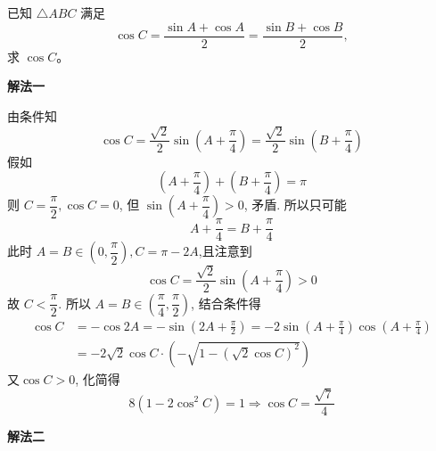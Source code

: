 \begin{questions}
    \question 已知 \(\triangle ABC\) 满足  
        \[
          \cos C = \frac{\sin A + \cos A}{2} = \frac{\sin B + \cos B}{2},
        \]
        求 \(\cos C\)。  
    \begin{solution}
        \textbf{解法一}
        
        由条件知 $$\cos C=\frac{\sqrt{2}}{2}\sin(A+\frac{\pi}{4})=\frac{\sqrt{2}}{2}\sin(B+\frac{\pi}{4})$$
        假如 $$(A+\frac{\pi}{4})+(B+\frac{\pi}{4})=\pi$$
        则 $C=\dfrac{\pi}{2},\cos C=0$, 但 $\sin(A+\dfrac{\pi}{4})>0$, 矛盾.
        所以只可能 $$A+\frac{\pi}{4}=B+\frac{\pi}{4}$$
        此时 $A=B\in(0,\dfrac{\pi}{2}),C=\pi-2A$,且注意到 $$\cos C=\frac{\sqrt{2}}{2}\sin(A+\frac{\pi}{4})>0$$故 $C<\dfrac{\pi}{2}$. 所以 $A=B\in(\dfrac{\pi}{4},\dfrac{\pi}{2})$, 结合条件得
        \begin{align*} 
        \cos C &= -\cos 2A = -\sin\left(2A+\frac{\pi}{2}\right) = -2\sin\left(A+\frac{\pi}{4}\right)\cos\left(A+\frac{\pi}{4}\right) \\ &= -2\sqrt{2}\cos C\cdot\left(-\sqrt{1-(\sqrt{2}\cos C)^{2}}\right)
        \end{align*}
        又$\cos C>0$, 化简得 $$8(1-2\cos^{2}C)=1\Rightarrow\cos C=\dfrac{\sqrt{7}}{4}$$
    \end{solution}  
    \begin{solution}
        \textbf{解法二}
        

\end{solution}
\end{questions}
